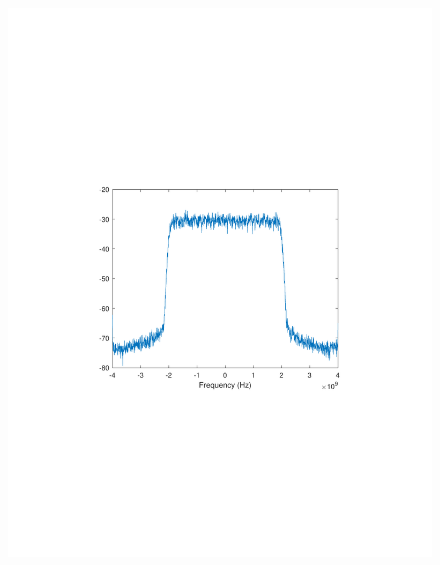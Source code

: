 \begin{refsection}
\begin{figure}[H]
	\centering
	\begin{minipage}{0.30\textwidth}
		\centering
		\includegraphics[clip, trim=4cm 8cm 4cm 8cm, width=1\textwidth]{./sdf/m_qam_system/figures/expResults/homodyne/5_4GBdInSig13dB_AfMIMO2.pdf}
		\label{fig:4GBdEyeMIMO2}
	\end{minipage}
	\begin{minipage}{0.30\textwidth}
		\centering

\end{minipage}
\end{figure}
\end{refsection}
